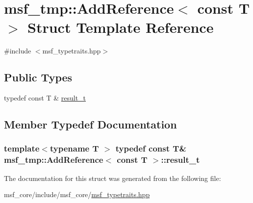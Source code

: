 \hypertarget{structmsf__tmp_1_1AddReference_3_01const_01T_01_4}{\section{msf\-\_\-tmp\-:\-:Add\-Reference$<$ const T $>$ Struct Template Reference}
\label{structmsf__tmp_1_1AddReference_3_01const_01T_01_4}
}


{\ttfamily \#include $<$msf\-\_\-typetraits.\-hpp$>$}

\subsection*{Public Types}
\begin{DoxyCompactItemize}
\item 
typedef const T \& \hyperlink{structmsf__tmp_1_1AddReference_3_01const_01T_01_4_a61dd4d81003c295d665d8eac16795c10}{result\-\_\-t}
\end{DoxyCompactItemize}


\subsection{Member Typedef Documentation}
\hypertarget{structmsf__tmp_1_1AddReference_3_01const_01T_01_4_a61dd4d81003c295d665d8eac16795c10}{
\subsubsection[{result\-\_\-t}]{\setlength{\rightskip}{0pt plus 5cm}template$<$typename T $>$ typedef const T\& {\bf msf\-\_\-tmp\-::\-Add\-Reference}$<$ const T $>$\-::{\bf result\-\_\-t}}}\label{structmsf__tmp_1_1AddReference_3_01const_01T_01_4_a61dd4d81003c295d665d8eac16795c10}


The documentation for this struct was generated from the following file\-:\begin{DoxyCompactItemize}
\item 
msf\-\_\-core/include/msf\-\_\-core/\hyperlink{msf__typetraits_8hpp}{msf\-\_\-typetraits.\-hpp}\end{DoxyCompactItemize}
